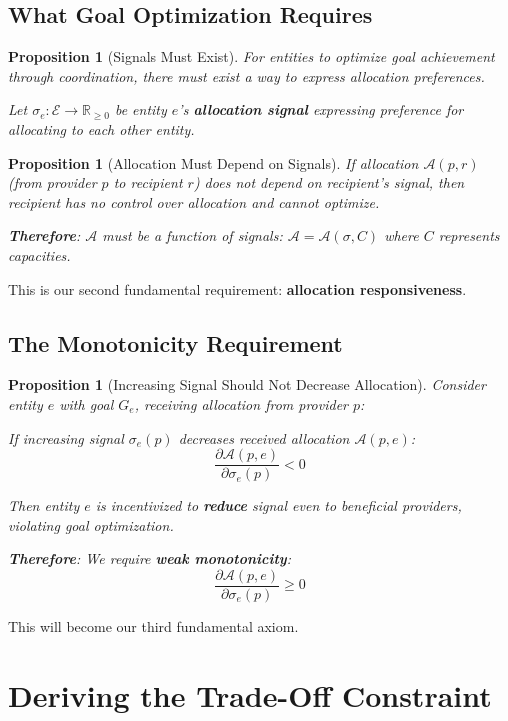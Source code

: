\documentclass[11pt,a4paper]{article}
\newtheorem{proposition}[theorem]{Proposition}
\theoremstyle{definition}
\theoremstyle{remark}
\newcommand{\E}{\mathcal{E}}
\newcommand{\A}{\mathcal{A}}
\begin{document}
\subsection{What Goal Optimization Requires}

\begin{proposition}[Signals Must Exist]
For entities to optimize goal achievement through coordination, there must exist a way to express allocation preferences.

Let $\sigma_e: \E \to \mathbb{R}_{\ge 0}$ be entity $e$'s \textbf{allocation signal} expressing preference for allocating to each other entity.
\end{proposition}

\begin{proposition}[Allocation Must Depend on Signals]
\label{prop:allocation-responsive}
If allocation $\A(p,r)$ (from provider $p$ to recipient $r$) does not depend on recipient's signal, then recipient has no control over allocation and cannot optimize.

\textbf{Therefore}: $\A$ must be a function of signals: $\A = \A(\sigma, C)$ where $C$ represents capacities.
\end{proposition}

This is our second fundamental requirement: \textbf{allocation responsiveness}.

\subsection{The Monotonicity Requirement}

\begin{proposition}[Increasing Signal Should Not Decrease Allocation]
\label{prop:monotonicity-needed}
Consider entity $e$ with goal $G_e$, receiving allocation from provider $p$:

If increasing signal $\sigma_e(p)$ \textit{decreases} received allocation $\A(p,e)$:
\[ \frac{\partial \A(p,e)}{\partial \sigma_e(p)} < 0 \]

Then entity $e$ is incentivized to \textbf{reduce} signal even to beneficial providers, violating goal optimization.

\textbf{Therefore}: We require \textbf{weak monotonicity}:
\[ \frac{\partial \A(p,e)}{\partial \sigma_e(p)} \ge 0 \]
\end{proposition}

This will become our third fundamental axiom.

\section{Deriving the Trade-Off Constraint}
\end{document}
